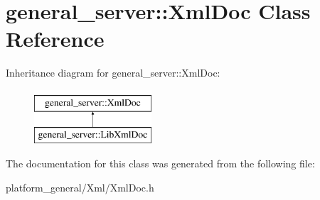\hypertarget{classgeneral__server_1_1XmlDoc}{\section{general\-\_\-server\-:\-:\-Xml\-Doc \-Class \-Reference}
\label{classgeneral__server_1_1XmlDoc}
}
\-Inheritance diagram for general\-\_\-server\-:\-:\-Xml\-Doc\-:\begin{figure}[H]
\begin{center}
\leavevmode
\includegraphics[height=2.000000cm]{classgeneral__server_1_1XmlDoc}
\end{center}
\end{figure}


\-The documentation for this class was generated from the following file\-:\begin{DoxyCompactItemize}
\item 
platform\-\_\-general/\-Xml/\-Xml\-Doc.\-h\end{DoxyCompactItemize}

